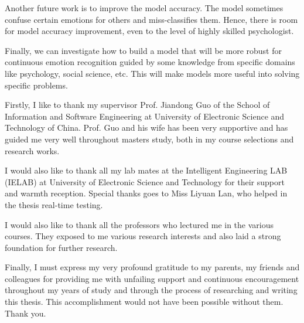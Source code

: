 \documentclass[master]{thesis-uestc}
\begin{document}
Another future work is to improve the model accuracy. The model sometimes confuse certain emotions for others and miss-classifies them. Hence, there is room for model accuracy improvement, even to the level of highly skilled psychologist.

Finally, we can investigate how to build a model that will be more robust for continuous emotion recognition guided by some knowledge from specific domains like psychology, social science, etc. This will make models more useful into solving specific problems.

\thesisacknowledgement
Firstly, I like to thank my supervisor Prof. Jiandong Guo of the School of Information and Software Engineering at University of Electronic Science and Technology of China. Prof. Guo and his wife has been very supportive and has guided me very well throughout masters study, both in my course selections and research works.

I would also like to thank all my lab mates at the Intelligent Engineering LAB (IELAB) at University of Electronic Science and Technology for their support and warmth reception. Special thanks goes to Miss Liyuan Lan, who helped in the thesis real-time testing.

I would also like to thank all the professors who lectured me in the various courses. They exposed to me various research interests and also laid a strong foundation for further research.

Finally, I must express my very profound gratitude to my parents, my friends and colleagues for providing me with unfailing support and continuous encouragement throughout my years of study and through the process of researching and writing this thesis. This accomplishment would not have been possible without them. Thank you.



%
% 
%


%

\end{document}
